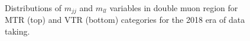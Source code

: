 \begin{figure}[htbp]
{    }
  \caption{Distributions of $m_{jj}$ and $m_{ll}$ variables in double muon region for MTR (top) and VTR (bottom) categories for the 2018 era of data taking.}
  \label{fig:2018_Zee_1}
\end{figure}


